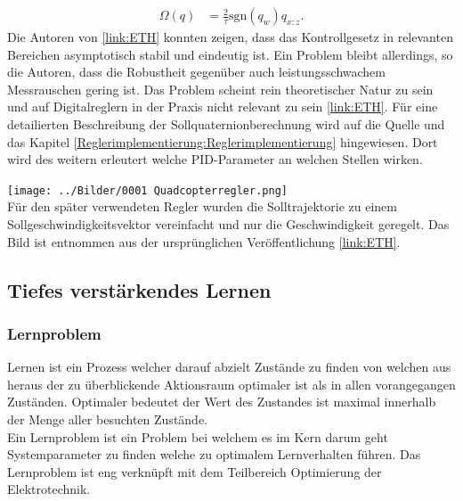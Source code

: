 \begin{align}
	\Omega(q) &= \frac{2}{\tau}\text{sgn}(q_{w})q_{x:z}.
\end{align}
Die Autoren von \ref{link:ETH} konnten zeigen, dass das Kontrollgesetz in relevanten Bereichen asymptotisch stabil und eindeutig ist. Ein Problem bleibt allerdings, so die Autoren, dass die Robustheit gegenüber auch leistungsschwachem Messrauschen gering ist. Das Problem scheint rein theoretischer Natur zu sein und auf Digitalreglern in der Praxis nicht relevant zu sein \ref{link:ETH}. Für eine detailierten Beschreibung der Sollquaternionberechnung wird auf die Quelle und das Kapitel \ref{Reglerimplementierung:Reglerimplementierung} hingewiesen. Dort wird des weitern erleutert welche PID-Parameter an welchen Stellen wirken.
\begin{center}
	\texttt{[image: ../Bilder/0001 Quadcopterregler.png]}{\\Für den später verwendeten Regler wurden die Solltrajektorie zu einem Sollgeschwindigkeitsvektor vereinfacht und nur die Geschwindigkeit geregelt. Das Bild ist entnommen aus der ursprünglichen Veröffentlichung \ref{link:ETH}.}
\end{center}


\subsection{Tiefes verstärkendes Lernen}

\subsubsection{Lernproblem}
Lernen ist ein Prozess welcher darauf abzielt Zustände zu finden von welchen aus heraus der zu überblickende Aktionsraum optimaler ist als in allen vorangegangen Zuständen. 
Optimaler bedeutet der Wert des Zustandes ist maximal innerhalb der Menge aller besuchten Zustände.\\
Ein Lernproblem ist ein Problem bei welchem es im Kern darum geht Systemparameter zu finden welche zu optimalem Lernverhalten führen. 
Das Lernproblem ist eng verknüpft mit dem Teilbereich Optimierung der Elektrotechnik. 

